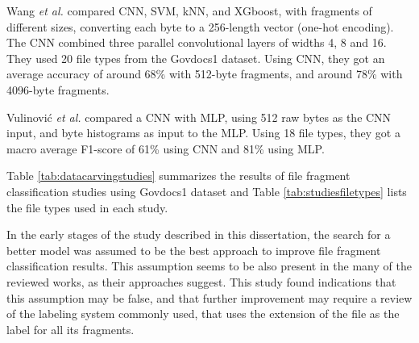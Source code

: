 Wang \textit{et al.} \cite{wang_file_2018}  
compared CNN, SVM, kNN, and XGboost, with fragments of different sizes, converting each byte to a 256-length vector (one-hot encoding). The CNN combined three parallel convolutional layers of widths 4, 8 and 16.
They used 20 file types from the Govdocs1 dataset.
Using CNN, they got an average accuracy of around 68\% with 512-byte fragments, and around 78\% with 4096-byte fragments.

Vulinović \textit{et al.} \cite{vulinovic_neural_2019}
compared a CNN with MLP, using 512 raw bytes as the CNN input, and byte histograms as input to the MLP.
Using 18 file types, they got a macro average F1-score of 61\% using CNN and 81\% using MLP.

Table \ref{tab:datacarvingstudies} summarizes 
the results of file fragment classification studies using Govdocs1 dataset and Table \ref{tab:studiesfiletypes}
lists the file types used in each study.






In the early stages of the study described in this dissertation, the search for a better model was assumed to be the best approach to improve file fragment classification results. This assumption seems to be also present in the many of the reviewed works, as their approaches suggest. This study found indications that this assumption may be false, and that further improvement may require a review of the labeling system commonly used, that uses the extension of the file as the label for all its fragments.
